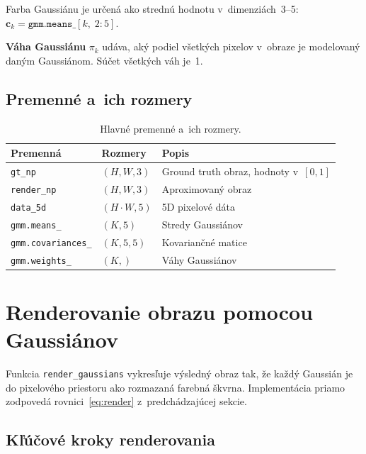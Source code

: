 \documentclass[a4paper,11pt]{article}
\begin{document}
Farba Gaussiánu je určená ako strednú hodnotu v~dimenziách~3--5:
$\mathbf{c}_k = \texttt{gmm.means\_}[k,\; 2{:}5]$.

\textbf{Váha Gaussiánu} $\pi_k$ udáva, aký podiel všetkých pixelov v~obraze
je modelovaný daným Gaussiánom.  Súčet všetkých váh je~1.

\subsection{Premenné a~ich rozmery}

\begin{table}[h]
\centering
\begin{tabular}{@{}lll@{}}
\toprule
\textbf{Premenná} & \textbf{Rozmery} & \textbf{Popis} \\
\midrule
\texttt{gt\_np}          & $(H, W, 3)$    & Ground truth obraz, hodnoty v~$[0,1]$ \\
\texttt{render\_np}      & $(H, W, 3)$    & Aproximovaný obraz \\
\texttt{data\_5d}        & $(H{\cdot}W, 5)$ & 5D pixelové dáta \\
\texttt{gmm.means\_}     & $(K, 5)$       & Stredy Gaussiánov \\
\texttt{gmm.covariances\_} & $(K, 5, 5)$  & Kovariančné matice \\
\texttt{gmm.weights\_}   & $(K,)$         & Váhy Gaussiánov \\
\bottomrule
\end{tabular}
\caption{Hlavné premenné a~ich rozmery.}
\label{tab:vars}
\end{table}

\section{Renderovanie obrazu pomocou Gaussiánov}
\label{sec:rendering}

Funkcia \texttt{render\_gaussians} vykresľuje výsledný obraz tak, že
každý Gaussián je  do pixelového priestoru ako rozmazaná
farebná škvrna.  Implementácia priamo zodpovedá rovnici~\eqref{eq:render}
z~predchádzajúcej sekcie.

\subsection{Kľúčové kroky renderovania}
\end{document}

